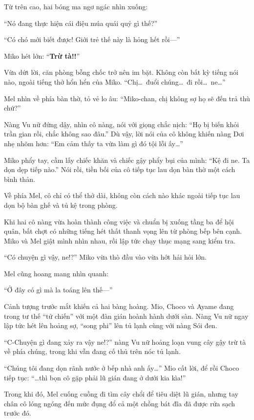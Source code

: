 \documentclass[../main.tex]{subfiles}
\begin{document}
Từ trên cao, hai bóng ma ngơ ngác nhìn xuống:

``Nó đang thực hiện cái điệu múa quái quỷ gì thế?''

``Có chó mới biết được! Giới trẻ thế này là hỏng hết rồi---''

Miko hét lớn: ``\textbf{Trừ tà!!}''

Vừa dứt lời, căn phòng bỗng chốc trở nên im bặt. Không còn bất kỳ tiếng nói nào, ngoài tiếng thở hổn hển của Miko. ``Chị\dots\ đuổi chúng\dots\ đi rồi\dots\ ne\dots''

Mel nhìn về phía bàn thờ, tỏ vẻ lo âu: ``Miko-chan, chị không sợ họ sẽ đến trả thù chứ?''

Nàng Vu nữ đứng dậy, nhìn cô nàng, nói với giọng chắc nịch: ``Họ bị biến khỏi trần gian rồi, chắc không sao đâu.'' Dù vậy, lời nói của cô không khiến nàng Dơi nhẹ nhõm hơn: ``Em cảm thấy ta vừa làm gì đó tội lỗi ấy\dots''

Miko phẩy tay, cầm lấy chiếc khăn và chiếc gậy phẩy bụi của mình: ``Kệ đi ne. Ta dọn dẹp tiếp nào.'' Nói rồi, tiền bối của cô tiếp tục lau dọn bàn thờ một cách bình thản.

Về phía Mel, cô chỉ có thể thở dài, không còn cách nào khác ngoài tiếp tục lau dọn bộ bàn ghế và tủ kệ trong phòng.

\ct

Khi hai cô nàng vừa hoàn thành công việc và chuẩn bị xuống tầng ba để hội quân, bất chợt có những tiếng hét thất thanh vọng lên từ phòng bếp bên cạnh. Miko và Mel giật mình nhìn nhau, rồi lập tức chạy thục mạng sang kiểm tra.

``Có chuyện gì vậy, ne!?'' Miko vừa thò đầu vào vừa hớt hải hỏi lớn.

Mel cũng hoang mang nhìn quanh:

``Ở đây có gì mà la toáng lên thế---''

Cảnh tượng trước mắt khiến cả hai bàng hoàng. Mio, Choco và Ayame đang trong tư thế ``tử chiến'' với một đàn gián hoành hành dưới sàn. Nàng Vu nữ ngay lập tức hét lên hoảng sợ, ``song phi'' lên tủ lạnh cùng với nàng Sói đen.

``C-Chuyện gì đang xảy ra vậy ne!?'' nàng Vu nữ hoảng loạn vung cây gậy trừ tà về phía chúng, trong khi vẫn đang cố thủ trên nóc tủ lạnh.

``Chúng tôi đang dọn rãnh nước ở bếp nhà anh ấy\dots'' Mio cất lời, để rồi Choco tiếp tục: ``\dots thì bọn cô gặp phải lũ gián đang ở dưới kia kìa!''

Trong khi đó, Mel cuống cuồng đi tìm cây chổi để tiêu diệt lũ gián, nhưng tay chân cô lóng ngóng đến mức đụng đổ cả một chồng bát đĩa đã được rửa sạch trước đó.
\end{document}
